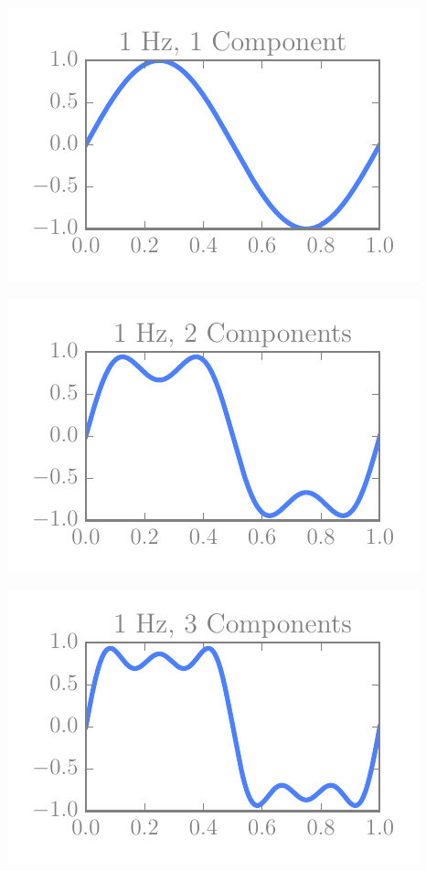 \begin{multicols}{2}
\includegraphics[width=\linewidth]{../img/fouriers/1_1.pdf}

\includegraphics[width=\linewidth]{../img/fouriers/1_2.pdf}

\includegraphics[width=\linewidth]{../img/fouriers/1_3.pdf}


\end{multicols}
